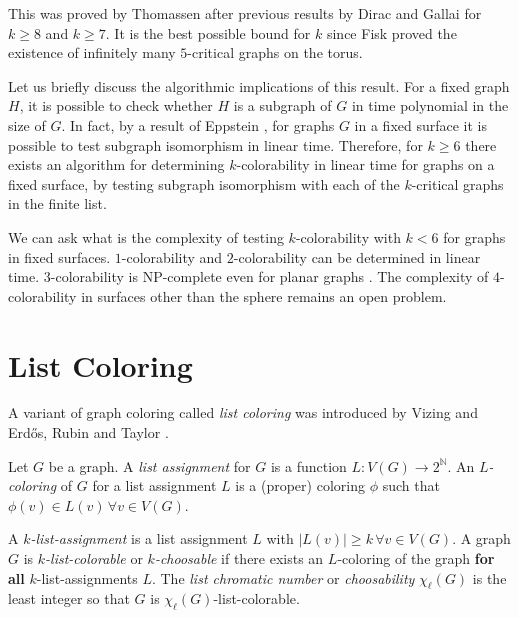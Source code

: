 This was proved by Thomassen after previous results by Dirac and Gallai for $k \geq 8$
and $k \geq 7$. It is the best possible bound for $k$ since Fisk \cite{fisk} proved
the existence of infinitely many $5$-critical graphs on the torus.

Let us briefly discuss the algorithmic implications of this result. For a fixed graph $H$, it 
is possible to check whether $H$ is a subgraph of $G$ in time polynomial in the size of $G$.
In fact, by a result of Eppstein \cite{eppstein}, for graphs $G$ in a fixed surface
it is possible to test subgraph isomorphism in linear time. Therefore, for $k \geq 6$ there exists an algorithm for determining $k$-colorability in linear time for graphs on a fixed surface,
by testing subgraph isomorphism with each of the $k$-critical graphs in the finite list. 

We can ask what is the complexity of testing $k$-colorability with $k < 6$ for graphs in fixed 
surfaces.
$1$-colorability and $2$-colorability can be determined in linear time. $3$-colorability is 
NP-complete even for planar graphs \cite{3colorabilitynpcomplete}. The complexity of $4$-colorability 
in surfaces other than the
sphere remains an open problem. 

\section{List Coloring}

A variant of graph coloring called \emph{list coloring} was introduced
by Vizing \cite{vizinglistcoloring} and Erdős, Rubin and Taylor \cite{erdoschoosability}.

\begin{definition}
	Let $G$ be a graph. A \emph{list assignment} for $G$ is a function 
	$L : V(G) \rightarrow 2^{\mathbb{N}}$. An \emph{$L$-coloring} of $G$ for a list assignment
	$L$ is a (proper) coloring $\phi$ such that $\phi(v) \in L(v) \, \forall v \in V(G)$. 
\end{definition}

\begin{definition}
A \emph{$k$-list-assignment} is a list assignment $L$ with $|L(v)| \geq k \, \forall v \in V(G)$. 
A graph $G$ is \emph{$k$-list-colorable} or \emph{$k$-choosable} if there exists an $L$-coloring
of the graph \textbf{for all} $k$-list-assignments $L$. 
The \emph{list chromatic number} or \emph{choosability} $\chi_{\ell}(G)$ is the least integer
so that $G$ is $\chi_{\ell}(G)$-list-colorable.
\end{definition}

